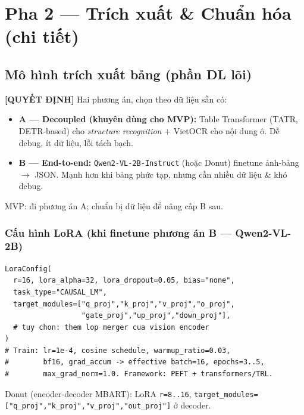 \documentclass[11pt,a4paper]{article}
\newcommand{\dec}[1]{\textbf{\color{fsgreen!60!black}[QUYẾT ĐỊNH]} #1}
\begin{document}
\section{Pha 2 --- Trích xuất \& Chuẩn hóa (chi tiết)}

\subsection{Mô hình trích xuất bảng (phần DL lõi)}
\begin{quyetdinh}
\dec{} Hai phương án, chọn theo dữ liệu sẵn có:
\begin{itemize}
  \item \textbf{A --- Decoupled (khuyên dùng cho MVP):} Table Transformer (TATR, DETR-based) cho \emph{structure recognition} + VietOCR cho nội dung ô. Dễ debug, ít dữ liệu, lỗi tách bạch.
  \item \textbf{B --- End-to-end:} \texttt{Qwen2-VL-2B-Instruct} (hoặc Donut) finetune ảnh-bảng $\rightarrow$ JSON. Mạnh hơn khi bảng phức tạp, nhưng cần nhiều dữ liệu \& khó debug.
\end{itemize}
MVP: đi phương án A; chuẩn bị dữ liệu để nâng cấp B sau.
\end{quyetdinh}

\subsubsection{Cấu hình LoRA (khi finetune phương án B --- Qwen2-VL-2B)}
\begin{Verbatim}
LoraConfig(
  r=16, lora_alpha=32, lora_dropout=0.05, bias="none",
  task_type="CAUSAL_LM",
  target_modules=["q_proj","k_proj","v_proj","o_proj",
                  "gate_proj","up_proj","down_proj"],
  # tuy chon: them lop merger cua vision encoder
)
# Train: lr=1e-4, cosine schedule, warmup_ratio=0.03,
#        bf16, grad_accum -> effective batch=16, epochs=3..5,
#        max_grad_norm=1.0. Framework: PEFT + transformers/TRL.
\end{Verbatim}
Donut (encoder-decoder MBART): LoRA \texttt{r=8..16}, \texttt{target\_modules=["q\_proj","k\_proj","v\_proj","out\_proj"]} ở decoder.
\end{document}
